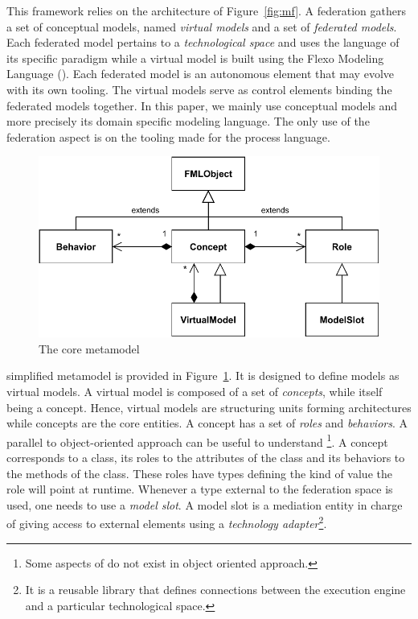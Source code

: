 This framework relies on the architecture of Figure~\ref{fig:mf}. A federation
gathers a set of conceptual models, named \emph{virtual models} and a
set of \emph{federated models}. Each federated model pertains to a
\emph{technological space} and uses the language of its specific
paradigm while a virtual model is built using the Flexo Modeling
Language (\FML). Each federated model is an autonomous
element that may evolve with its own tooling. The virtual models
serve as control elements binding the federated models together.
In this paper, we mainly use conceptual models and more precisely \FML its domain specific modeling language. The only use of the federation aspect is on the tooling made for the process language.

\begin{figure}[t]
    \centering
    \includegraphics[width=\columnwidth]{Figures/FMLCoreModel.pdf}
    \caption{The \FML core metamodel}
    \label{fig:mm}
\end{figure}

\FML simplified metamodel is provided in Figure~\ref{fig:mm}. It is designed to define models as virtual models. A virtual model
is composed of a set of \emph{concepts}, while itself being a concept.
Hence, virtual models are structuring units forming architectures while concepts are the
core entities. A concept has a set of \emph{roles} and
\emph{behaviors}. A parallel to object-oriented approach can be useful
to understand \FML\footnote{Some aspects of \FML do not exist in object oriented approach.}. A concept corresponds to a class, its roles to the
attributes of the class and its behaviors to the methods of the class.
These roles have types defining the kind of value the role will point
at runtime.
Whenever a type external to the federation space is used, one needs to use a \emph{model slot}. A model
slot is a mediation entity in charge of giving
access to external elements using
a \emph{technology adapter}\footnote{It is a reusable library that defines
connections between the \FML execution engine and a particular
technological space.}.

